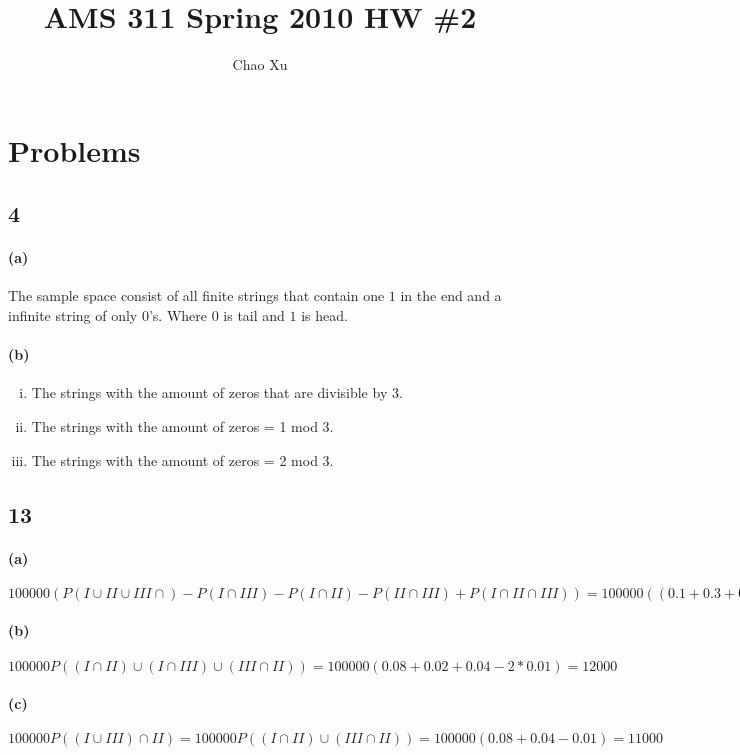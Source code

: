 \documentclass[letter]{article}
\title{AMS 311 Spring 2010 HW \#2}
\date{}
\author{Chao Xu}
\begin{document}
\maketitle
\vspace{-.5in}
\section*{Problems}
\subsection*{4}
\paragraph*{(a)}
The sample space consist of all finite strings that contain one $1$ in the end and a infinite string of only $0$'s. Where $0$ is tail and $1$ is head.
\paragraph*{(b)}
\begin{enumerate}[(i)]
 \item The strings with the amount of zeros that are divisible by 3.
 \item The strings with the amount of zeros = 1 mod 3.
 \item The strings with the amount of zeros = 2 mod 3.
\end{enumerate}

\subsection*{13}
\paragraph*{(a)}
$100000 (P(I\cup II\cup III \cap)-P(I\cap III) -P(I\cap II)- P(II\cap III) + P(I\cap II \cap III)) =100000((0.1 + 0.3 + 0.05 - 0.08 - 0.02 - 0.04 + 2*0.01) - 0.08 - 0.02 - 
  0.04 + 0.01) = 20000$
\paragraph*{(b)}
$100000 P((I\cap II)\cup (I\cap III) \cup (III\cap II)) = 100000(0.08+0.02+0.04-2*0.01) = 12000$
\paragraph*{(c)}
$100000 P((I\cup III) \cap II) = 100000 P((I\cap II) \cup (III\cap II)) = 100000(0.08+0.04-0.01) = 11000$
\end{document}
